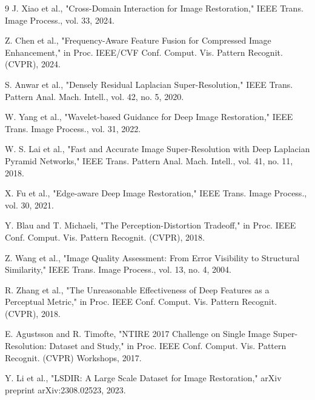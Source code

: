 \documentclass[12pt]{article}
\begin{document}
\begin{thebibliography}{9}
J. Xiao et al., "Cross-Domain Interaction for Image Restoration," IEEE Trans. Image Process., vol. 33, 2024.

Z. Chen et al., "Frequency-Aware Feature Fusion for Compressed Image Enhancement," in Proc. IEEE/CVF Conf. Comput. Vis. Pattern Recognit. (CVPR), 2024.

S. Anwar et al., "Densely Residual Laplacian Super-Resolution," IEEE Trans. Pattern Anal. Mach. Intell., vol. 42, no. 5, 2020.

W. Yang et al., "Wavelet-based Guidance for Deep Image Restoration," IEEE Trans. Image Process., vol. 31, 2022.

W. S. Lai et al., "Fast and Accurate Image Super-Resolution with Deep Laplacian Pyramid Networks," IEEE Trans. Pattern Anal. Mach. Intell., vol. 41, no. 11, 2018.

X. Fu et al., "Edge-aware Deep Image Restoration," IEEE Trans. Image Process., vol. 30, 2021.

Y. Blau and T. Michaeli, "The Perception-Distortion Tradeoff," in Proc. IEEE Conf. Comput. Vis. Pattern Recognit. (CVPR), 2018.

Z. Wang et al., "Image Quality Assessment: From Error Visibility to Structural Similarity," IEEE Trans. Image Process., vol. 13, no. 4, 2004.

R. Zhang et al., "The Unreasonable Effectiveness of Deep Features as a Perceptual Metric," in Proc. IEEE Conf. Comput. Vis. Pattern Recognit. (CVPR), 2018.

E. Agustsson and R. Timofte, "NTIRE 2017 Challenge on Single Image Super-Resolution: Dataset and Study," in Proc. IEEE Conf. Comput. Vis. Pattern Recognit. (CVPR) Workshops, 2017.

Y. Li et al., "LSDIR: A Large Scale Dataset for Image Restoration," arXiv preprint arXiv:2308.02523, 2023.

\end{thebibliography}
\end{document}

